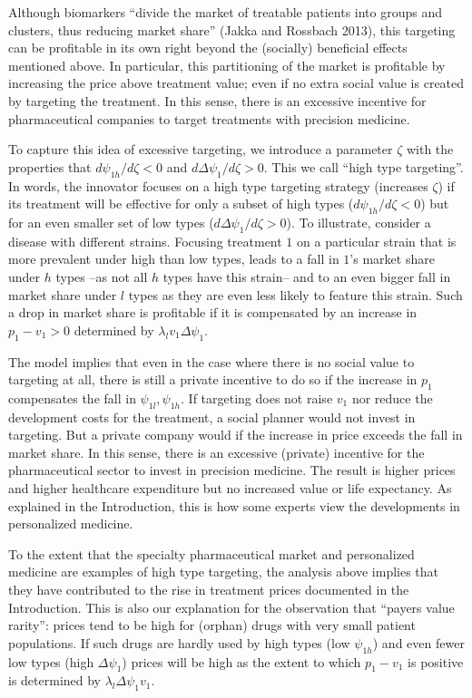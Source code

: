 \documentclass[a4paper,12pt]{article}
\makeatletter
\newcommand{\citeprocitem}[2]{\hyper@linkstart{cite}{citeproc_bib_item_#1}#2\hyper@linkend}
\makeatother
\begin{document}
Although biomarkers ``divide the market of treatable patients into groups and clusters, thus reducing market share'' (\citeprocitem{24}{Jakka and Rossbach 2013}), this targeting can be profitable in its own right beyond the (socially) beneficial effects mentioned above. In particular, this partitioning of the market is profitable by increasing the price above treatment value; even if no extra social value is created by targeting the treatment. In this sense, there is an excessive incentive for pharmaceutical companies to target treatments with precision medicine.

To capture this idea of excessive targeting, we introduce a parameter \(\zeta\) with the properties that \(d\psi_{1h}/d\zeta <0\) and \(d\Delta \psi_1/d\zeta>0\). This we call ``high type targeting''. In words, the innovator focuses on a high type targeting strategy (increases \(\zeta\)) if its treatment will be effective for only a subset of high types (\(d\psi_{1h}/d\zeta <0\)) but for an even smaller set of low types (\(d\Delta\psi_1/d\zeta>0\)). To illustrate, consider a disease with different strains. Focusing treatment \(1\) on a particular strain that is more prevalent under high than low types, leads to a fall in \(1\)'s market share under \(h\) types --as not all \(h\) types have this strain-- and to an even bigger fall in market share under \(l\) types as they are even less likely to feature this strain. Such a drop in market share is profitable if it is compensated by an increase in \(p_1-v_1>0\) determined by \(\lambda_l v_1 \Delta \psi_1\).

The model implies that even in the case where there is no social value to targeting at all, there is still a private incentive to do so if the increase in \(p_1\) compensates the fall in \(\psi_{1l},\psi_{1h}\). If targeting does not raise \(v_1\) nor reduce the development costs for the treatment, a social planner would not invest in targeting. But a private company would if the increase in price exceeds the fall in market share. In this sense, there is an excessive (private) incentive for the pharmaceutical sector to invest in precision medicine. The result is higher prices and higher healthcare expenditure but no increased value or life expectancy. As explained in the Introduction, this is how some experts view the developments in personalized medicine.

To the extent that the specialty pharmaceutical market and  personalized medicine are examples of high type targeting, the analysis above implies that they have contributed to the rise in treatment prices documented in the Introduction. This is also our explanation for the observation that ``payers value rarity'': prices tend to be high for (orphan) drugs with very small patient populations. If such drugs are hardly used by high types (low \(\psi_{1h}\)) and even fewer low types (high \(\Delta \psi_1\)) prices will be high as the extent to which \(p_1-v_1\) is positive is determined by \(\lambda_l \Delta \psi_1 v_1\).
\end{document}
